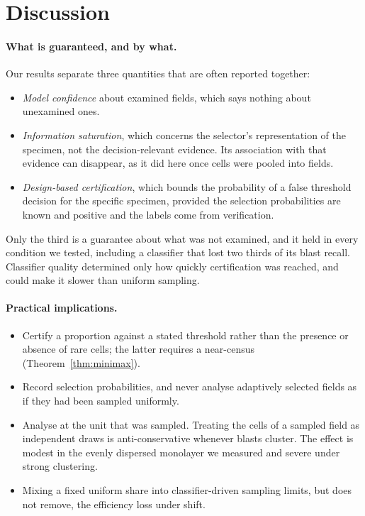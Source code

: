 \documentclass[11pt]{article}
\theoremstyle{remark}
\theoremstyle{definition}
\begin{document}
\section{Discussion}
\paragraph{What is guaranteed, and by what.} Our results separate three quantities that are often reported together:
\begin{itemize}
\item \emph{Model confidence} about examined fields, which says nothing about unexamined ones.
\item \emph{Information saturation}, which concerns the selector's representation of the specimen, not the decision-relevant evidence. Its association with that evidence can disappear, as it did here once cells were pooled into fields.
\item \emph{Design-based certification}, which bounds the probability of a false threshold decision for the specific specimen, provided the selection probabilities are known and positive and the labels come from verification.
\end{itemize}
Only the third is a guarantee about what was not examined, and it held in every condition we tested, including a classifier that lost two thirds of its blast recall. Classifier quality determined only how quickly certification was reached, and could make it slower than uniform sampling.

\paragraph{Practical implications.}
\begin{itemize}
\item Certify a proportion against a stated threshold rather than the presence or absence of rare cells; the latter requires a near-census (Theorem~\ref{thm:minimax}).
\item Record selection probabilities, and never analyse adaptively selected fields as if they had been sampled uniformly.
\item Analyse at the unit that was sampled. Treating the cells of a sampled field as independent draws is anti-conservative whenever blasts cluster. The effect is modest in the evenly dispersed monolayer we measured and severe under strong clustering.
\item Mixing a fixed uniform share into classifier-driven sampling limits, but does not remove, the efficiency loss under shift.
\end{itemize}
\end{document}
